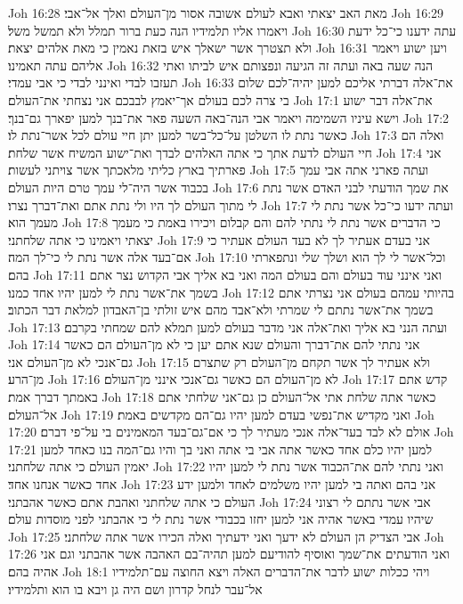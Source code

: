 Joh 16:28  מאת האב יצאתי ואבא לעולם אשובה אסור מן־העולם ואלך אל־אבי׃
Joh 16:29  ויאמרו אליו תלמידיו הנה כעת ברור תמלל ולא תמשל משל׃
Joh 16:30  עתה ידענו כי־כל ידעת ולא תצטרך אשר ישאלך איש בזאת נאמין כי מאת אלהים יצאת׃
Joh 16:31  ויען ישוע ויאמר אליהם עתה תאמינו׃
Joh 16:32  הנה שעה באה ועתה זה הגיעה ונפצותם איש לביתו ואתי תעזבו לבדי ואינני לבדי כי אבי עמדי׃
Joh 16:33  את־אלה דברתי אליכם למען יהיה־לכם שלום בי צרה לכם בעולם אך־יאמץ לבבכם אני נצחתי את־העולם׃
Joh 17:1  את־אלה דבר ישוע וישא עיניו השמימה ויאמר אבי הנה־באה השעה פאר את־בנך למען יפארך גם־בנך׃
Joh 17:2  כאשר נתת לו השלטן על־כל־בשר למען יתן חיי עולם לכל אשר־נתת לו׃
Joh 17:3  ואלה הם חיי העולם לדעת אתך כי אתה האלהים לבדך ואת־ישוע המשיח אשר שלחת׃
Joh 17:4  אני פארתיך בארץ כליתי מלאכתך אשר צויתני לעשות׃
Joh 17:5  ועתה פארני אתה אבי עמך בכבוד אשר היה־לי עמך טרם היות העולם׃
Joh 17:6  את שמך הודעתי לבני האדם אשר נתת לי מתוך העולם לך היו ולי נתת אתם ואת־דברך נצרו׃
Joh 17:7  ועתה ידעו כי־כל אשר נתת לי מעמך הוא׃
Joh 17:8  כי הדברים אשר נתת לי נתתי להם והם קבלום ויכירו באמת כי מעמך יצאתי ויאמינו כי אתה שלחתני׃
Joh 17:9  אני בעדם אעתיר לך לא בעד העולם אעתיר כי אם־בעד אלה אשר נתת לי כי־לך המה׃
Joh 17:10  וכל־אשר לי לך הוא ושלך שלי ונתפארתי בהם׃
Joh 17:11  ואני אינני עוד בעולם והם בעולם המה ואני בא אליך אבי הקדוש נצר אתם בשמך את־אשר נתת לי למען יהיו אחד כמנו׃
Joh 17:12  בהיותי עמהם בעולם אני נצרתי אתם בשמך את־אשר נתתם לי שמרתי ולא־אבד מהם איש זולתי בן־האבדון למלאת דבר הכתוב׃
Joh 17:13  ועתה הנני בא אליך ואת־אלה אני מדבר בעולם למען תמלא להם שמחתי בקרבם׃
Joh 17:14  אני נתתי להם את־דברך והעולם שנא אתם יען כי לא מן־העולם הם כאשר גם־אנכי לא מן־העולם אני׃
Joh 17:15  ולא אעתיר לך אשר תקחם מן־העולם רק שתצרם מן־הרע׃
Joh 17:16  לא מן־העולם הם כאשר גם־אנכי אינני מן־העולם׃
Joh 17:17  קדש אתם באמתך דברך אמת׃
Joh 17:18  כאשר אתה שלחת אתי אל־העולם כן גם־אני שלחתי אתם אל־העולם׃
Joh 17:19  ואני מקדיש את־נפשי בעדם למען יהיו גם־הם מקדשים באמת׃
Joh 17:20  אולם לא לבד בעד־אלה אנכי מעתיר לך כי אם־גם־בעד המאמינים בי על־פי דברם׃
Joh 17:21  למען יהיו כלם אחד כאשר אתה אבי בי אתה ואני בך והיו גם־המה בנו כאחד למען יאמין העולם כי אתה שלחתני׃
Joh 17:22  ואני נתתי להם את־הכבוד אשר נתת לי למען יהיו אחד כאשר אנחנו אחד׃
Joh 17:23  אני בהם ואתה בי למען יהיו משלמים לאחד ולמען ידע העולם כי אתה שלחתני ואהבת אתם כאשר אהבתני׃
Joh 17:24  אבי אשר נתתם לי רצוני שיהיו עמדי באשר אהיה אני למען יחזו בכבודי אשר נתת לי כי אהבתני לפני מוסדות עולם׃
Joh 17:25  אבי הצדיק הן העולם לא ידעך ואני ידעתיך ואלה הכירו אשר אתה שלחתני׃
Joh 17:26  ואני הודעתים את־שמך ואוסיף להודיעם למען תהיה־בם האהבה אשר אהבתני וגם אני אהיה בהם׃
Joh 18:1  ויהי ככלות ישוע לדבר את־הדברים האלה ויצא החוצה עם־תלמידיו אל־עבר לנחל קדרון ושם היה גן ויבא בו הוא ותלמידיו׃
